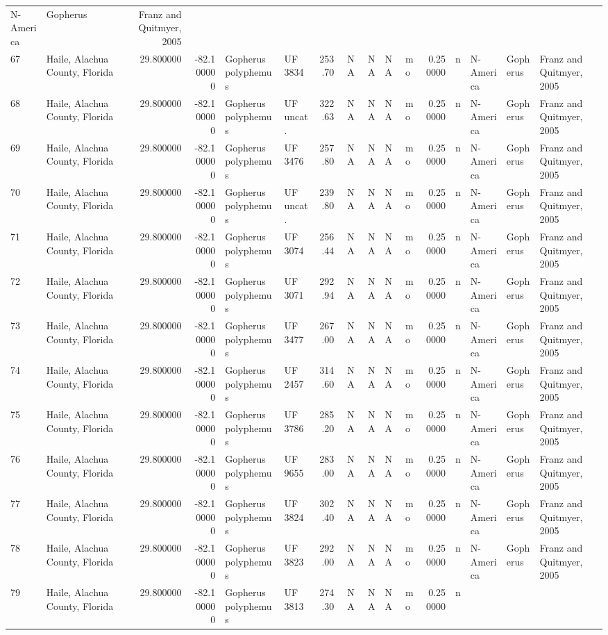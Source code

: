 \documentclass[]{article}
\begin{document}
\begin{longtable}[]{@{}llrrllrrrllrllll@{}}
N-America & Gopherus & Franz and Quitmyer, 2005\tabularnewline
67 & Haile, Alachua County, Florida & 29.800000 & -82.100000 & Gopherus
polyphemus & UF 3834 & 253.70 & NA & NA & NA & mo & 0.250000 & n &
N-America & Gopherus & Franz and Quitmyer, 2005\tabularnewline
68 & Haile, Alachua County, Florida & 29.800000 & -82.100000 & Gopherus
polyphemus & UF uncat. & 322.63 & NA & NA & NA & mo & 0.250000 & n &
N-America & Gopherus & Franz and Quitmyer, 2005\tabularnewline
69 & Haile, Alachua County, Florida & 29.800000 & -82.100000 & Gopherus
polyphemus & UF 3476 & 257.80 & NA & NA & NA & mo & 0.250000 & n &
N-America & Gopherus & Franz and Quitmyer, 2005\tabularnewline
70 & Haile, Alachua County, Florida & 29.800000 & -82.100000 & Gopherus
polyphemus & UF uncat. & 239.80 & NA & NA & NA & mo & 0.250000 & n &
N-America & Gopherus & Franz and Quitmyer, 2005\tabularnewline
71 & Haile, Alachua County, Florida & 29.800000 & -82.100000 & Gopherus
polyphemus & UF 3074 & 256.44 & NA & NA & NA & mo & 0.250000 & n &
N-America & Gopherus & Franz and Quitmyer, 2005\tabularnewline
72 & Haile, Alachua County, Florida & 29.800000 & -82.100000 & Gopherus
polyphemus & UF 3071 & 292.94 & NA & NA & NA & mo & 0.250000 & n &
N-America & Gopherus & Franz and Quitmyer, 2005\tabularnewline
73 & Haile, Alachua County, Florida & 29.800000 & -82.100000 & Gopherus
polyphemus & UF 3477 & 267.00 & NA & NA & NA & mo & 0.250000 & n &
N-America & Gopherus & Franz and Quitmyer, 2005\tabularnewline
74 & Haile, Alachua County, Florida & 29.800000 & -82.100000 & Gopherus
polyphemus & UF 2457 & 314.60 & NA & NA & NA & mo & 0.250000 & n &
N-America & Gopherus & Franz and Quitmyer, 2005\tabularnewline
75 & Haile, Alachua County, Florida & 29.800000 & -82.100000 & Gopherus
polyphemus & UF 3786 & 285.20 & NA & NA & NA & mo & 0.250000 & n &
N-America & Gopherus & Franz and Quitmyer, 2005\tabularnewline
76 & Haile, Alachua County, Florida & 29.800000 & -82.100000 & Gopherus
polyphemus & UF 9655 & 283.00 & NA & NA & NA & mo & 0.250000 & n &
N-America & Gopherus & Franz and Quitmyer, 2005\tabularnewline
77 & Haile, Alachua County, Florida & 29.800000 & -82.100000 & Gopherus
polyphemus & UF 3824 & 302.40 & NA & NA & NA & mo & 0.250000 & n &
N-America & Gopherus & Franz and Quitmyer, 2005\tabularnewline
78 & Haile, Alachua County, Florida & 29.800000 & -82.100000 & Gopherus
polyphemus & UF 3823 & 292.00 & NA & NA & NA & mo & 0.250000 & n &
N-America & Gopherus & Franz and Quitmyer, 2005\tabularnewline
79 & Haile, Alachua County, Florida & 29.800000 & -82.100000 & Gopherus
polyphemus & UF 3813 & 274.30 & NA & NA & NA & mo & 0.250000 & n &

\end{longtable}
\end{document}
